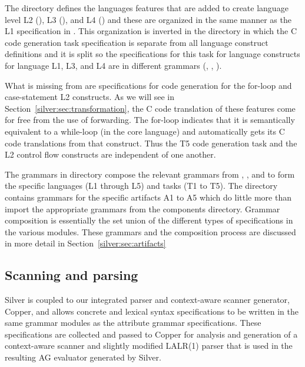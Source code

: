 The  directory defines the languages features that
are added to create language level L2 (), L3
(), and L4 () and these are 
organized in the same manner as the L1 specification in .
%
This organization is inverted in the  directory
in which the C code generation task specification is separate from all
language construct definitions and it is split so the specifications
for this task for language constructs for language L1, L3, and L4 are
in different grammars (, ,
).

What is missing from  are specifications for code
generation for the for-loop and case-statement L2 constructs.  As we
will see in Section~\ref{silver:sec:transformation}, the C code
translation of these features come for free from the use of
forwarding.  The for-loop indicates that it is semantically equivalent
to a while-loop (in the core language) and automatically gets its C
code translations from that construct.  Thus the T5 code generation task
and the L2 control flow constructs are independent of one another.

The grammars in  directory compose the relevant
grammars from , , and  to form
the specific languages (L1 through L5) and tasks (T1 to T5).  The
 directory contains grammars for the specific
artifacts A1 to A5 which do little more than import the appropriate
grammars from the components directory.  
%
Grammar composition is essentially the set union of the different
types of specifications in the various modules.
%
These grammars and the composition process are discussed in more
detail in Section~\ref{silver:sec:artifacts}


\subsection{Scanning and parsing}

Silver is coupled to our integrated parser and context-aware scanner
generator, Copper, and allows concrete and lexical syntax
specifications to be written in the same grammar modules as the
attribute grammar specifications.  These specifications are collected
and passed to Copper for analysis and generation of a context-aware
scanner and slightly modified LALR(1) parser that is used in the
resulting AG evaluator generated by Silver.

